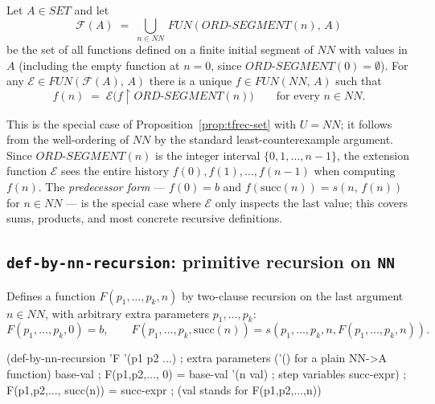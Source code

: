 \begin{prop}\label{prop:nn-rec}
Let $A \in \mathit{SET}$ and let
\[
  \mathcal{F}(A) \;=\; \bigcup_{n \in \mathit{NN}}\,\mathit{FUN}(\mathit{ORD\text{-}SEGMENT}(n),\, A)
\]
be the set of all functions defined on a finite initial segment of $\mathit{NN}$
with values in $A$ (including the empty function at $n = 0$, since
$\mathit{ORD\text{-}SEGMENT}(0) = \emptyset$).
For any $\mathcal{E} \in \mathit{FUN}(\mathcal{F}(A),\, A)$ there is a unique
$f \in \mathit{FUN}(\mathit{NN},\, A)$ such that
\[
  f(n) \;=\; \mathcal{E}\!\bigl(f \!\restriction\! \mathit{ORD\text{-}SEGMENT}(n)\bigr)
  \qquad \text{for every } n \in \mathit{NN}.
\]
\end{prop}

\begin{remark}
This is the special case of Proposition~\ref{prop:tfrec-set} with
$U = \mathit{NN}$; it follows from the well-ordering of $\mathit{NN}$ by the
standard least-counterexample argument.
Since $\mathit{ORD\text{-}SEGMENT}(n)$ is the integer interval $\{0, 1, \ldots, n-1\}$,
the extension function $\mathcal{E}$ sees the entire history
$f(0), f(1), \ldots, f(n-1)$ when computing $f(n)$.
The \emph{predecessor form} --- $f(0) = b$ and
$f(\mathrm{succ}(n)) = s(n,\, f(n))$ for $n \in \mathit{NN}$ --- is the special case
where $\mathcal{E}$ only inspects the last value; this covers sums, products,
and most concrete recursive definitions.
\end{remark}

\subsection{\texttt{def-by-nn-recursion}: primitive recursion on \texttt{NN}}

Defines a function $F(p_1, \ldots, p_k, n)$ by two-clause recursion on the
last argument $n \in \mathit{NN}$, with arbitrary extra parameters
$p_1, \ldots, p_k$:
\[
  F(p_1,\ldots,p_k,0) = b, \qquad
  F(p_1,\ldots,p_k,\mathrm{succ}(n)) = s(p_1,\ldots,p_k,n,F(p_1,\ldots,p_k,n)).
\]

\begin{VNBcode}
(def-by-nn-recursion 'F
  '(p1 p2 ...)      ; extra parameters ('() for a plain NN->A function)
  base-val          ; F(p1,p2,..., 0) = base-val
  '(n val)          ; step variables
  succ-expr)        ; F(p1,p2,..., succ(n)) = succ-expr
                    ;   (val stands for F(p1,p2,...,n))
\end{VNBcode}

